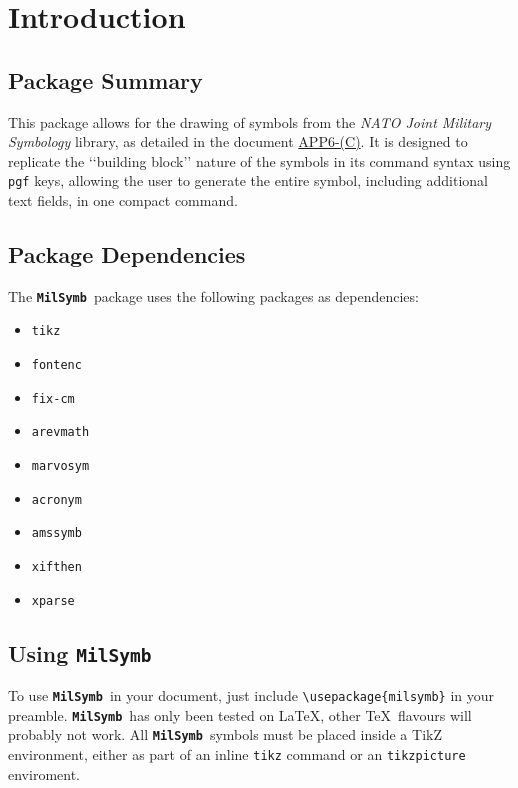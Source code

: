 \documentclass[a4paper, titlepage]{article}
\newcommand\MilSymb{\textbf{\texttt{MilSymb}}}
\newcommand\DocLink{\href{https://www.awl.edu.pl/images/en/APP_6_C.pdf}{APP6-(C)}}
\begin{document}
\clearpage

\tableofcontents

\clearpage

\section{Introduction}

\subsection{Package Summary}

This package allows for the drawing of symbols from the \textit{NATO Joint Military Symbology} library, as detailed in the document \DocLink. It is designed to replicate the \lq\lq{}building block\rq\rq{} nature of the symbols in its command syntax using \texttt{pgf} keys, allowing the user to generate the entire symbol, including additional text fields, in one compact command.

\subsection{Package Dependencies}

The \MilSymb\  package uses the following packages as dependencies:

\begin{itemize}
\item \texttt{tikz}
\item \texttt{fontenc}
\item \texttt{fix-cm}
\item \texttt{arevmath}
\item \texttt{marvosym}
\item \texttt{acronym}
\item \texttt{amssymb}
\item \texttt{xifthen}
\item \texttt{xparse}
\end{itemize}

\subsection{Using \MilSymb}

To use \MilSymb\  in your document, just include \texttt{\textbackslash usepackage\{milsymb\}} in your preamble. \MilSymb\  has only been tested on \LaTeX, other \TeX\  flavours will probably not work. All \MilSymb\  symbols must be placed inside a TikZ environment, either as part of an inline \texttt{tikz} command or an \texttt{tikzpicture} enviroment. 
\end{document}
